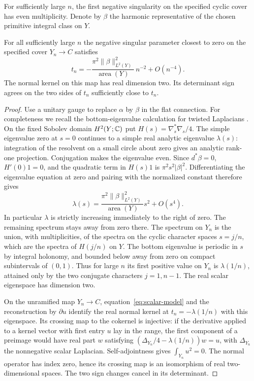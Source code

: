 For sufficiently large $n$, the first negative singularity on the
specified cyclic cover has even multiplicity. Denote by $\beta$ the harmonic representative of the
chosen primitive integral class on $Y$.

\begin{corollary}\label{cor:cyclic}
For all sufficiently large $n$ the negative singular parameter closest
to zero on the specified cover $Y_n\to C$ satisfies
\[
 t_n=-\frac{\pi^2\|\beta\|^2_{L^2(Y)}}{\operatorname{area}(Y)}\,n^{-2}
          +O(n^{-4}).
\]
The normal kernel on this map has real dimension two. Its determinant
sign agrees on the two sides of $t_n$ sufficiently close to $t_n$.
\end{corollary}
\begin{proof}
Use a unitary gauge to replace $\alpha$ by $\beta$ in the flat
connection. For completeness we recall the bottom-eigenvalue
calculation for twisted Laplacians
\cite[Remark~2.3 and Lemmas~4.4--4.5]{gi}. On the fixed Sobolev
domain $H^2(Y;\mathbb C)$ put $H(s)=\nabla_s^*\nabla_s/4$.
The simple eigenvalue zero at $s=0$ continues to a simple real
analytic eigenvalue $\lambda(s)$: integration of the resolvent on a
small circle about zero gives an analytic rank-one projection.
Conjugation makes the eigenvalue even. Since $d^*\beta=0$,
$H'(0)1=0$, and the quadratic term in $H(s)1$ is
$\pi^2s^2|\beta|^2$. Differentiating the eigenvalue equation at
zero and pairing with the normalized constant therefore gives
\[
 \lambda(s)=\frac{\pi^2\|\beta\|^2_{L^2(Y)}}{\operatorname{area}(Y)}
                       s^2+O(s^4).
\]
In particular $\lambda$ is strictly increasing immediately to the
right of zero. The remaining spectrum stays away from zero there.
The spectrum on $Y_n$ is the union, with multiplicities, of the
spectra on the cyclic character spaces $s=j/n$, which are the
spectra of $H(j/n)$ on $Y$. The bottom eigenvalue is periodic in
$s$ by integral holonomy, and bounded below away from zero on compact
subintervals of $(0,1)$. Thus for large $n$ its first positive value
on $Y_n$ is $\lambda(1/n)$, attained only by the two conjugate
characters $j=1,n-1$. The real scalar eigenspace has dimension two.

On the unramified map $Y_n\to C$, equation~\eqref{eq:scalar-model}
and the reconstruction by $\partial u$ identify the real normal
kernel at $t_n=-\lambda(1/n)$ with this eigenspace. Its crossing map
to the cokernel is injective: if the derivative applied to a kernel
vector with first entry $u$ lay in the range, the first component
of a preimage would have real part $w$ satisfying
$(\Delta_{Y_n}/4-\lambda(1/n))w=u$, with $\Delta_{Y_n}$ the
nonnegative scalar Laplacian. Self-adjointness gives $\int_{Y_n}u^2=0$.
The normal operator has index zero, hence its crossing map is an
isomorphism of real two-dimensional spaces. The two sign changes
cancel in its determinant.
\end{proof}

